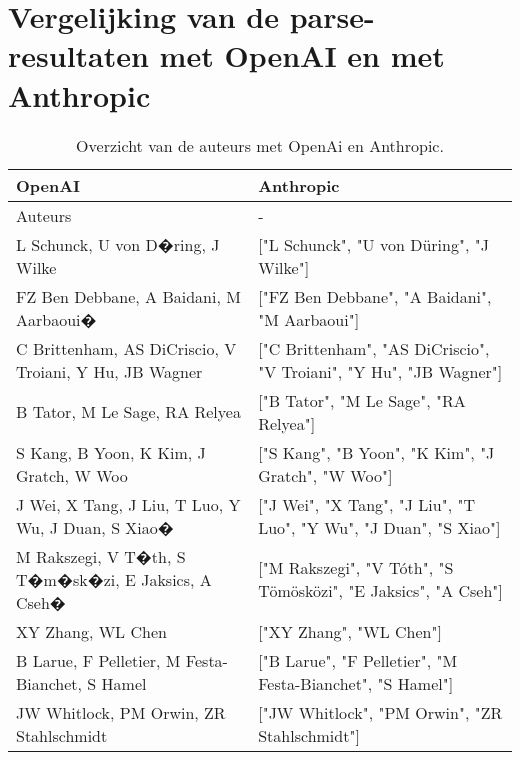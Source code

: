 \section{Vergelijking van de parse-resultaten met OpenAI en met Anthropic}
\begin{table}[h!]
    \caption{Overzicht van de auteurs met OpenAi en Anthropic.}
    \centering
    \begin{tabularx}{\textwidth}{|X|X|} 
        \hline
        \rowcolor{lightgray}
        OpenAI & Anthropic \\ 
        \hline
        \rowcolor{lightgray}
        Auteurs & - \\ 
        \hline
        L Schunck, U von D�ring, J Wilke & ["L Schunck", "U von Düring", "J Wilke"] \\ 
        FZ Ben Debbane, A Baidani, M Aarbaoui� & ["FZ Ben Debbane", "A Baidani", "M Aarbaoui"] \\
        C Brittenham, AS DiCriscio, V Troiani, Y Hu, JB Wagner & ["C Brittenham", "AS DiCriscio", "V Troiani", "Y Hu", "JB Wagner"] \\
        B Tator, M Le Sage, RA Relyea & ["B Tator", "M Le Sage", "RA Relyea"] \\
        S Kang, B Yoon, K Kim, J Gratch, W Woo & ["S Kang", "B Yoon", "K Kim", "J Gratch", "W Woo"] \\
        J Wei, X Tang, J Liu, T Luo, Y Wu, J Duan, S Xiao� & ["J Wei", "X Tang", "J Liu", "T Luo", "Y Wu", "J Duan", "S Xiao"] \\
        M Rakszegi, V T�th, S T�m�sk�zi, E Jaksics, A Cseh� & ["M Rakszegi", "V Tóth", "S Tömösközi", "E Jaksics", "A Cseh"] \\
        XY Zhang, WL Chen & ["XY Zhang", "WL Chen"] \\
        B Larue, F Pelletier, M Festa-Bianchet, S Hamel & ["B Larue", "F Pelletier", "M Festa-Bianchet", "S Hamel"] \\
        JW Whitlock, PM Orwin, ZR Stahlschmidt & ["JW Whitlock", "PM Orwin", "ZR Stahlschmidt"] \\
        \hline
    \end{tabularx}
    \label{table:llmAuteur}
\end{table}
